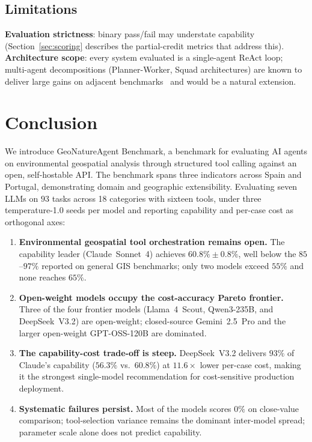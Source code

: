 \documentclass[sigconf]{acmart}
\begin{document}
\subsection{Limitations}

\textbf{Evaluation strictness}: binary pass/fail may understate capability (Section~\ref{sec:scoring} describes the partial-credit metrics that address this). \textbf{Architecture scope}: every system evaluated is a single-agent ReAct loop; multi-agent decompositions (Planner-Worker, Squad architectures) are known to deliver large gains on adjacent benchmarks~\citep{luo2025geojsonagents, lee2025geollmsquad} and would be a natural extension.


\section{Conclusion}
\label{sec:conclusion}

We introduce GeoNatureAgent Benchmark, a benchmark for evaluating AI agents on environmental geospatial analysis through structured tool calling against an open, self-hostable API. The benchmark spans three indicators across Spain and Portugal, demonstrating domain and geographic extensibility. Evaluating seven LLMs on $93$ tasks across 18 categories with sixteen tools, under three temperature-1.0 seeds per model and reporting capability and per-case cost as orthogonal axes:

\begin{enumerate}
    \item \textbf{Environmental geospatial tool orchestration remains open.} The capability leader (Claude~Sonnet~4) achieves $60.8\% \pm 0.8\%$, well below the $85$--$97\%$ reported on general GIS benchmarks; only two models exceed $55\%$ and none reaches $65\%$.
    \item \textbf{Open-weight models occupy the cost-accuracy Pareto frontier.} Three of the four frontier models (Llama~4~Scout, Qwen3-235B, and DeepSeek~V3.2) are open-weight; closed-source Gemini~2.5~Pro and the larger open-weight GPT-OSS-120B are dominated.
    \item \textbf{The capability-cost trade-off is steep.} DeepSeek~V3.2 delivers $93\%$ of Claude's capability ($56.3\%$ vs.\ $60.8\%$) at $11.6\times$ lower per-case cost, making it the strongest single-model recommendation for cost-sensitive production deployment.
    \item \textbf{Systematic failures persist.} Most of the models scores $0\%$ on close-value comparison; tool-selection variance remains the dominant inter-model spread; parameter scale alone does not predict capability.
\end{enumerate}
\end{document}
